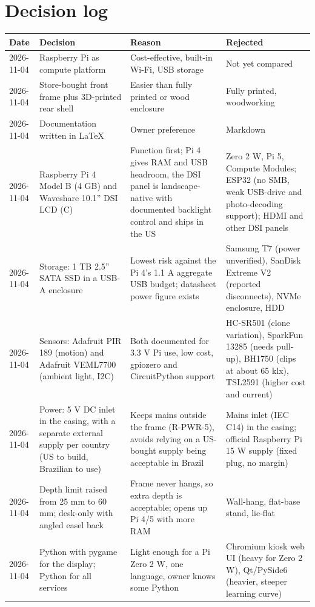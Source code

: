 \documentclass[11pt,a4paper]{article}
\begin{document}
\section{Decision log}
\begin{longtable}{l p{4.2cm} p{4.2cm} p{3cm}}
\toprule
\textbf{Date} & \textbf{Decision} & \textbf{Reason} & \textbf{Rejected} \\
\midrule\endhead
2026-11-04 & Raspberry Pi as compute platform & Cost-effective, built-in Wi-Fi, USB storage & Not yet compared \\
2026-11-04 & Store-bought front frame plus 3D-printed rear shell & Easier than fully printed or wood enclosure & Fully printed, woodworking \\
2026-11-04 & Documentation written in \LaTeX{} & Owner preference & Markdown \\
2026-11-04 & Raspberry Pi 4 Model B (4 GB) and Waveshare 10.1'' DSI LCD (C) & Function first; Pi 4 gives RAM and USB headroom, the DSI panel is landscape-native with documented backlight control and ships in the US & Zero 2 W, Pi 5, Compute Modules; ESP32 (no SMB, weak USB-drive and photo-decoding support); HDMI and other DSI panels \\
2026-11-04 & Storage: 1 TB 2.5'' SATA SSD in a USB-A enclosure & Lowest risk against the Pi 4's 1.1 A aggregate USB budget; datasheet power figure exists & Samsung T7 (power unverified), SanDisk Extreme V2 (reported disconnects), NVMe enclosure, HDD \\
2026-11-04 & Sensors: Adafruit PIR 189 (motion) and Adafruit VEML7700 (ambient light, I2C) & Both documented for 3.3 V Pi use, low cost, gpiozero and CircuitPython support & HC-SR501 (clone variation), SparkFun 13285 (needs pull-up), BH1750 (clips at about 65 klx), TSL2591 (higher cost and current) \\
2026-11-04 & Power: 5 V DC inlet in the casing, with a separate external supply per country (US to build, Brazilian to use) & Keeps mains outside the frame (R-PWR-5), avoids relying on a US-bought supply being acceptable in Brazil & Mains inlet (IEC C14) in the casing; official Raspberry Pi 15 W supply (fixed plug, no margin) \\
2026-11-04 & Depth limit raised from 25 mm to 60 mm; desk-only with angled easel back & Frame never hangs, so extra depth is acceptable; opens up Pi 4/5 with more RAM & Wall-hang, flat-base stand, lie-flat \\
2026-11-04 & Python with pygame for the display; Python for all services & Light enough for a Pi Zero 2 W, one language, owner knows some Python & Chromium kiosk web UI (heavy for Zero 2 W), Qt/PySide6 (heavier, steeper learning curve) \\
\bottomrule
\end{longtable}
\end{document}
